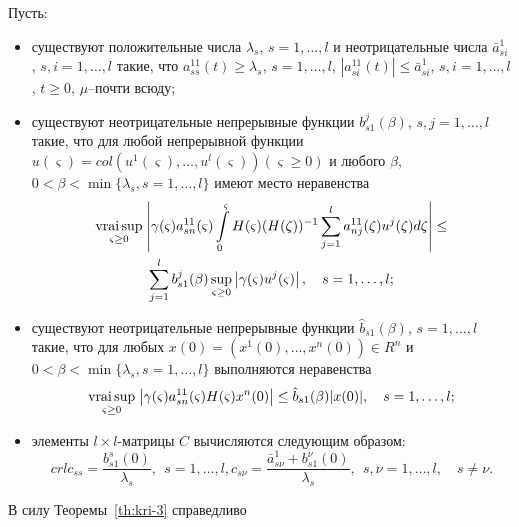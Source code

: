Пусть:
\begin{itemize}
    \item существуют положительные числа  $ \lambda _s$, $s = 1, \dots, l$ и
    неотрицательные числа $\bar a_{si}^1$, $s,i = 1,
     \dots, l$ такие, что $a^{11}_{ss}(t) \geq
     \lambda _s$, $s = 1,\dots,l$, $|a^{11}_{si}(t)|\leq \bar a^1_{si}$, $s,i = 1, \dots, l$, $t \geq 0$, $\mu$--почти
    всюду;

    \item существуют неотрицательные непрерывные функции $b_{s1}^j(\beta)$,
    $s, j = 1, \dots, l$ такие, что для любой непрерывной функции
    $u(\varsigma ) = col (u^1 (\varsigma), \dots, u^l(\varsigma))
    (\varsigma\geq 0)$ и любого $\beta$, $0 < \beta < \min \{\lambda _s,
    s = 1,
    \dots, l \}$ имеют  место неравенства \\
\begin{multline*}
     \mathrel {\mathop
     {\operatorname*{vrai} \sup}\limits _{\varsigma \geq 0}} \left |\gamma (\varsigma )a^{11}_{sn}(\varsigma )
    \int \limits _{0}^\varsigma H(\varsigma)(H(\zeta))^{-1}\sum \limits
    _{j=1}^l a_{nj}^{11}(\zeta)u^j(\zeta )d\zeta \right | \leq\\
    \sum\limits_{j=1}^lb_{s1}^j(\beta)\sup \limits _{\varsigma \geq 0}\left|\gamma (\varsigma)u^j(\varsigma)\right|, \quad s = 1,\dots,l;
\end{multline*}
    \item существуют неотрицательные непрерывные функции  $\hat
    b_{s1}(\beta)$, $s= 1, \dots, l$ такие,  что для любых  $ x (0) = (x^1
    (0), \dots, x^n(0)) \in R^n$ и $0 < \beta < \min \{\lambda _s, s = 1,
    \dots, l \}$ выполняются неравенства
    \begin{equation*}
    \mathrel {\mathop
     {\operatorname*{vrai} \sup}\limits _{\varsigma \geq 0}} \left |\gamma (\varsigma )a^{11}_{sn}(\varsigma )
    H(\varsigma)x^n(0)\right | \leq \hat b_{s1}(\beta)|x(0)|, \quad s =
    1,\dots,l;
    \end{equation*}

    \item элементы $l\times l$-матрицы $C$ вычисляются следующим образом:
    \begin{equation*}{crl}
    c_{ss} = \frac{b^s_{s1}(0)}{\lambda _s }, \ \  s = 1,\dots,l, c_{s\nu}
    = \frac{\bar a^{1}_{s\nu} + b^\nu_{s1}(0)}{\lambda _s }, \ \ s,\nu =
    1,\dots,l, \quad s \neq \nu.
    \end{equation*}
\end{itemize}

В силу Теоремы~\ref{th:kri-3} справедливо

